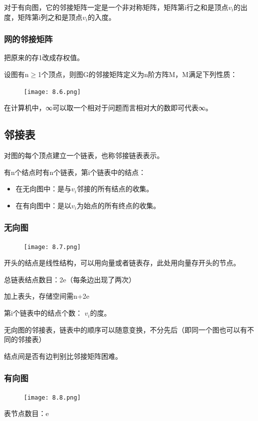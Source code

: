 \documentclass[AutoFakeBold]{LZUThesis2007}
\begin{document}
对于有向图，它的邻接矩阵一定是一个非对称矩阵，矩阵第i行之和是顶点$v_{i}$的出度，矩阵第i列之和是顶点$v_{i}$的入度。
			\subsubsection{网的邻接矩阵}
把原来的存1改成存权值。

设图有n$\ge$1个顶点，则图G的邻接矩阵定义为n阶方阵M，M满足下列性质：

\begin{figure}[H]
    \centering
    \texttt{[image: 8.6.png]}
    
    \label{fig_install_texlive}
\end{figure}

在计算机中，∞可以取一个相对于问题而言相对大的数即可代表∞。
		\subsection{邻接表}
对图的每个顶点建立一个链表，也称邻接链表表示。

有n个结点时有n个链表，第i个链表中的结点：
			\begin{itemize}
				\item 在无向图中：是与$v_{i}$邻接的所有结点的收集。
				\item 在有向图中：是以$v_{i}$为始点的所有终点的收集。
			\end{itemize}

			\subsubsection{无向图}
\begin{figure}[H]
    \centering
    \texttt{[image: 8.7.png]}
    
    \label{fig_install_texlive}
\end{figure}
开头的结点是线性结构，可以用向量或者链表存，此处用向量存开头的节点。

总链表结点数目：2e（每条边出现了两次）

加上表头，存储空间需n+2e

第i个链表中的结点个数： $v_{i}$的度。

无向图的邻接表，链表中的顺序可以随意变换，不分先后（即同一个图也可以有不同的邻接表）

结点间是否有边判别比邻接矩阵困难。
			\subsubsection{有向图}
\begin{figure}[H]
    \centering
    \texttt{[image: 8.8.png]}
    
    \label{fig_install_texlive}
\end{figure}
表节点数目：e
\end{document}
